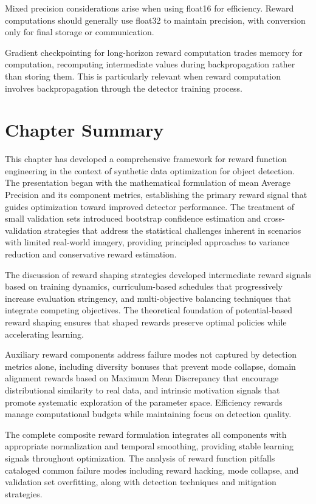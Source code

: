 Mixed precision considerations arise when using float16 for efficiency. Reward computations should generally use float32 to maintain precision, with conversion only for final storage or communication.

Gradient checkpointing for long-horizon reward computation trades memory for computation, recomputing intermediate values during backpropagation rather than storing them. This is particularly relevant when reward computation involves backpropagation through the detector training process.

\section{Chapter Summary}

This chapter has developed a comprehensive framework for reward function engineering in the context of synthetic data optimization for object detection. The presentation began with the mathematical formulation of mean Average Precision and its component metrics, establishing the primary reward signal that guides optimization toward improved detector performance. The treatment of small validation sets introduced bootstrap confidence estimation and cross-validation strategies that address the statistical challenges inherent in scenarios with limited real-world imagery, providing principled approaches to variance reduction and conservative reward estimation.

The discussion of reward shaping strategies developed intermediate reward signals based on training dynamics, curriculum-based schedules that progressively increase evaluation stringency, and multi-objective balancing techniques that integrate competing objectives. The theoretical foundation of potential-based reward shaping ensures that shaped rewards preserve optimal policies while accelerating learning.

Auxiliary reward components address failure modes not captured by detection metrics alone, including diversity bonuses that prevent mode collapse, domain alignment rewards based on Maximum Mean Discrepancy that encourage distributional similarity to real data, and intrinsic motivation signals that promote systematic exploration of the parameter space. Efficiency rewards manage computational budgets while maintaining focus on detection quality.

The complete composite reward formulation integrates all components with appropriate normalization and temporal smoothing, providing stable learning signals throughout optimization. The analysis of reward function pitfalls cataloged common failure modes including reward hacking, mode collapse, and validation set overfitting, along with detection techniques and mitigation strategies.

